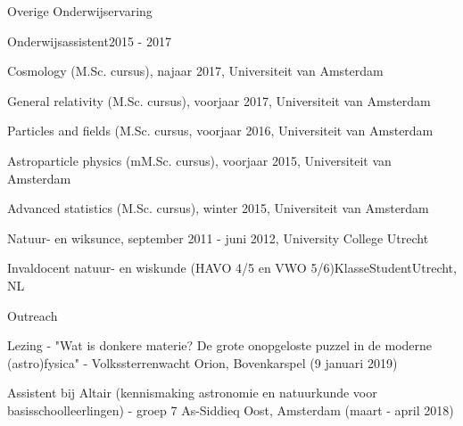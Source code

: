 \begin{rSection}{Overige Onderwijservaring}

\begin{rSubsection}{Onderwijsassistent}{2015 - 2017}{}{}
  \vspace{-1.5em}
	\item Cosmology (M.Sc. cursus), najaar 2017, Universiteit van Amsterdam
	\item General relativity (M.Sc. cursus), voorjaar 2017, Universiteit van Amsterdam
	\item Particles and fields (M.Sc. cursus, voorjaar 2016, Universiteit van Amsterdam
	\item Astroparticle physics (mM.Sc. cursus), voorjaar 2015, Universiteit van Amsterdam
	\item Advanced statistics (M.Sc. cursus), winter 2015, Universiteit van Amsterdam
  \item Natuur- en wiksunce, september 2011 - juni 2012, University College Utrecht 
\end{rSubsection}

\begin{rSubsection}{Invaldocent natuur- en wiskunde (HAVO 4/5 en VWO 5/6)}{}{KlasseStudent}{Utrecht, NL}
  \vspace{-1.5em}
\end{rSubsection}

\begin{rSubsection}{Outreach}{}{}{}
  \vspace{-1.5em}
      \item Lezing - "Wat is donkere materie? De grote onopgeloste puzzel in de moderne (astro)fysica" - Volkssterrenwacht Orion,  Bovenkarspel (9 januari 2019)
      \item Assistent bij Altair (kennismaking astronomie en natuurkunde voor basisschoolleerlingen) - groep 7 As-Siddieq Oost, Amsterdam (maart - april 2018)
\end{rSubsection}
\end{rSection}


